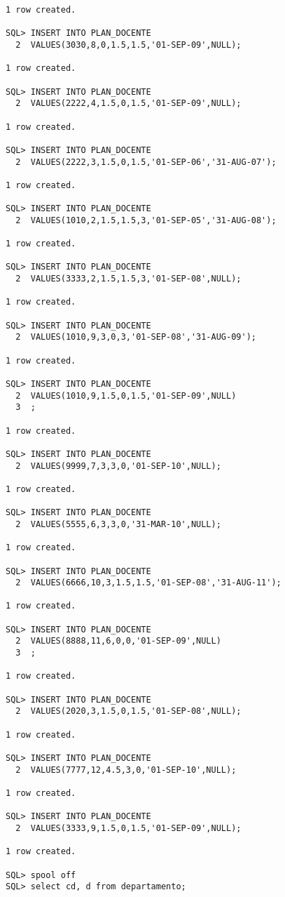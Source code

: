 \documentclass[11pt]{report}
\begin{document}
\begin{verbatim}
1 row created.

SQL> INSERT INTO PLAN_DOCENTE
  2  VALUES(3030,8,0,1.5,1.5,'01-SEP-09',NULL);

1 row created.

SQL> INSERT INTO PLAN_DOCENTE
  2  VALUES(2222,4,1.5,0,1.5,'01-SEP-09',NULL);

1 row created.

SQL> INSERT INTO PLAN_DOCENTE
  2  VALUES(2222,3,1.5,0,1.5,'01-SEP-06','31-AUG-07');

1 row created.

SQL> INSERT INTO PLAN_DOCENTE
  2  VALUES(1010,2,1.5,1.5,3,'01-SEP-05','31-AUG-08');

1 row created.

SQL> INSERT INTO PLAN_DOCENTE
  2  VALUES(3333,2,1.5,1.5,3,'01-SEP-08',NULL);

1 row created.

SQL> INSERT INTO PLAN_DOCENTE
  2  VALUES(1010,9,3,0,3,'01-SEP-08','31-AUG-09');

1 row created.

SQL> INSERT INTO PLAN_DOCENTE
  2  VALUES(1010,9,1.5,0,1.5,'01-SEP-09',NULL)
  3  ;

1 row created.

SQL> INSERT INTO PLAN_DOCENTE
  2  VALUES(9999,7,3,3,0,'01-SEP-10',NULL);

1 row created.

SQL> INSERT INTO PLAN_DOCENTE
  2  VALUES(5555,6,3,3,0,'31-MAR-10',NULL);

1 row created.

SQL> INSERT INTO PLAN_DOCENTE
  2  VALUES(6666,10,3,1.5,1.5,'01-SEP-08','31-AUG-11');

1 row created.

SQL> INSERT INTO PLAN_DOCENTE
  2  VALUES(8888,11,6,0,0,'01-SEP-09',NULL)
  3  ;

1 row created.

SQL> INSERT INTO PLAN_DOCENTE
  2  VALUES(2020,3,1.5,0,1.5,'01-SEP-08',NULL);

1 row created.

SQL> INSERT INTO PLAN_DOCENTE
  2  VALUES(7777,12,4.5,3,0,'01-SEP-10',NULL);

1 row created.

SQL> INSERT INTO PLAN_DOCENTE
  2  VALUES(3333,9,1.5,0,1.5,'01-SEP-09',NULL);

1 row created.

SQL> spool off
SQL> select cd, d from departamento;


\end{verbatim}
\end{document}
